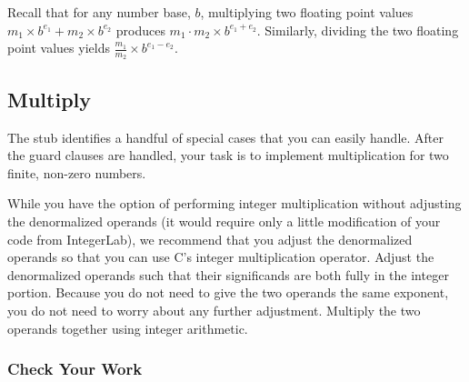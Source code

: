 Recall that for any number base, $b$, multiplying two floating point values $m_1 \times b^{e_1} + m_2 \times b^{e_2}$ produces $m_1 \cdot m_2 \times b^{e_1 + e_2}$.
Similarly, dividing the two floating point values yields $\frac{m_1}{m_2} \times b^{e_1 - e_2}$.

\subsection{Multiply}

The  stub identifies a handful of special cases that you can easily handle.
After the guard clauses are handled, your task is to implement multiplication for two finite, non-zero numbers.

While you have the option of performing integer multiplication without adjusting the denormalized operands (it would require only a little modification of your code from IntegerLab), we recommend that you adjust the denormalized operands so that you can use C's integer multiplication operator.
Adjust the denormalized operands such that their significands are both fully in the integer portion.
Because you do not need to give the two operands the same exponent, you do not need to worry about any further adjustment.
Multiply the two operands together using integer arithmetic.

\subsubsection*{Check Your Work}

